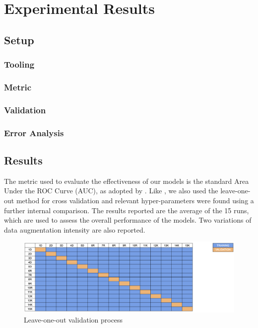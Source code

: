 \chapter{Experimental Results}

\section{Setup}

\subsection{Tooling}

\subsection{Metric}

\subsection{Validation}

\subsection{Error Analysis}

\section{Results}

The metric used to evaluate the effectiveness of our models is the standard Area Under the ROC Curve (AUC), as adopted by \cite{abs-1807-01631}. Like \cite{CelonaM17}, we also used the leave-one-out method for cross validation and relevant hyper-parameters were found using a further internal comparison. The results reported are the average of the 15 runs, which are used to assess the overall performance of the models. Two variations of data augmentation intensity are also reported.

\begin{figure}[h!tp]
    \centering
    \includegraphics[width=1\textwidth]{imgs/chap4_validation.png}
    \caption{Leave-one-out validation process}
    \label{fig:validation}
\end{figure}

